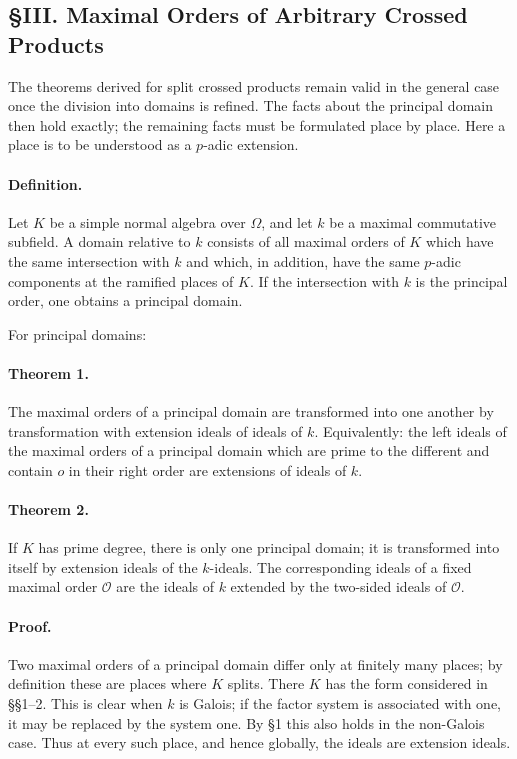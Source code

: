 \documentclass[11pt]{article}
\begin{document}
\subsection*{§III. Maximal Orders of Arbitrary Crossed Products}

The theorems derived for split crossed products remain valid in the general case once the division into domains is refined. The facts about the principal domain then hold exactly; the remaining facts must be formulated place by place. Here a place is to be understood as a \(p\)-adic extension.

\paragraph{Definition.}
Let \(K\) be a simple normal algebra over \(\Omega\), and let \(k\) be a maximal commutative subfield. A domain relative to \(k\) consists of all maximal orders of \(K\) which have the same intersection with \(k\) and which, in addition, have the same \(p\)-adic components at the ramified places of \(K\). If the intersection with \(k\) is the principal order, one obtains a principal domain.

For principal domains:

\paragraph{Theorem 1.}
The maximal orders of a principal domain are transformed into one another by transformation with extension ideals of ideals of \(k\). Equivalently: the left ideals of the maximal orders of a principal domain which are prime to the different and contain \(o\) in their right order are extensions of ideals of \(k\).

\paragraph{Theorem 2.}
If \(K\) has prime degree, there is only one principal domain; it is transformed into itself by extension ideals of the \(k\)-ideals. The corresponding ideals of a fixed maximal order \(\mathcal O\) are the ideals of \(k\) extended by the two-sided ideals of \(\mathcal O\).

\paragraph{Proof.}
Two maximal orders of a principal domain differ only at finitely many places; by definition these are places where \(K\) splits. There \(K\) has the form considered in §§1--2. This is clear when \(k\) is Galois; if the factor system is associated with one, it may be replaced by the system one. By §1 this also holds in the non-Galois case. Thus at every such place, and hence globally, the ideals are extension ideals.
\end{document}

